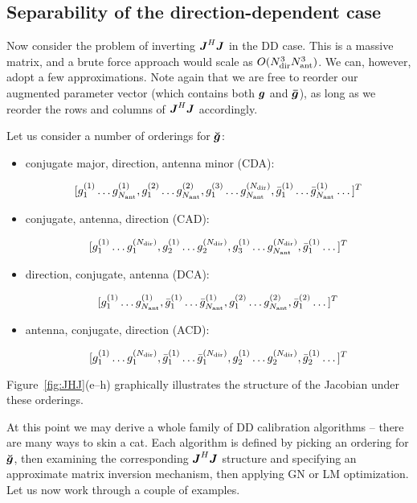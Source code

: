 \documentclass[useAMS,usenatbib]{mn2e}
\newcommand{\mat}[1]{{\bmath{#1}}}
\newcommand{\JJ}{\mat{J}} %
\newcommand{\JHJ}{\JJ^H\JJ} %
\newcommand{\AUG}[1]{\bmath{\breve{#1}}}
\newcommand{\Gg}{\AUG{g}}
\begin{document}
\subsection{Separability of the direction-dependent case}

Now consider the problem of inverting $\JHJ$ in the DD case. This is a massive matrix, and a brute force 
approach would scale as $O(N_\mathrm{dir}^3N_\mathrm{ant}^3)$. We can, however, adopt a few approximations. Note again that we are 
free to reorder our augmented parameter vector (which contains both $\bmath{g}$ and $\bmath{\bar g}$), 
as long as we reorder the rows and columns of $\JHJ$ accordingly.

Let us consider a number of orderings for $\Gg$:

\begin{itemize}
\item conjugate major, direction, antenna minor (CDA):

\[
[g^{(1)}_1 \dots g^{(1)}_{N_\mathrm{ant}}, g^{(2)}_1 \dots g^{(2)}_{N_\mathrm{ant}}, g^{(3)}_1 \dots g^{(N_\mathrm{dir})}_{N_\mathrm{ant}}, 
 \bar{g}^{(1)}_1 \dots \bar{g}^{(1)}_{N_\mathrm{ant}} \dots ]^T
\]

\item conjugate, antenna, direction (CAD):

\[
[g^{(1)}_1 \dots g^{(N_\mathrm{dir})}_1, g^{(1)}_2 \dots g^{(N_\mathrm{dir})}_2, g^{(1)}_3 \dots g^{(N_\mathrm{dir})}_{N_\mathrm{ant}}, 
 \bar{g}^{(1)}_1 \dots ]^T
\]

\item direction, conjugate, antenna (DCA):

\[
[g^{(1)}_1 \dots g^{(1)}_{N_\mathrm{ant}},\bar{g}^{(1)}_1 \dots \bar{g}^{(1)}_{N_\mathrm{ant}},
g^{(2)}_1 \dots g^{(2)}_{N_\mathrm{ant}}, \bar{g}^{(2)}_1 \dots ]^T
\]

\item antenna, conjugate, direction (ACD):

\[
[g^{(1)}_1 \dots g^{(N_\mathrm{dir})}_1,\bar{g}^{(1)}_1 \dots \bar{g}^{(N_\mathrm{dir})}_1,
g^{(1)}_2 \dots g^{(N_\mathrm{dir})}_2, \bar{g}^{(1)}_2 \dots ]^T
\]

\end{itemize}

Figure~\ref{fig:JHJ}(e--h) graphically illustrates the structure of the Jacobian under these orderings.

At this point we may derive a whole family of DD calibration algorithms -- there are many ways to skin a cat. Each 
algorithm is defined by picking an ordering for $\Gg$, then examining the corresponding $\JHJ$ structure and specifying 
an approximate matrix inversion mechanism, then applying GN or LM optimization. Let us now work through a couple of examples.
\end{document}

